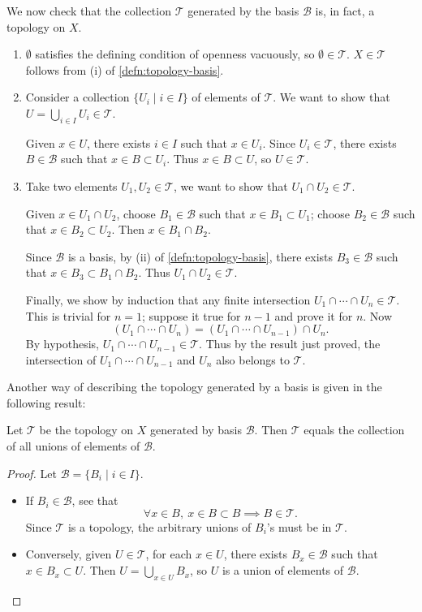 We now check that the collection $\mathcal{T}$ generated by the basis $\mathcal{B}$ is, in fact, a topology on $X$.
\begin{enumerate}[label=(\roman*)]
\item $\emptyset$ satisfies the defining condition of openness vacuously, so $\emptyset\in\mathcal{T}$. $X\in\mathcal{T}$ follows from (i) of \cref{defn:topology-basis}.
\item Consider a collection $\{U_i\mid i\in I\}$ of elements of $\mathcal{T}$. We want to show that $U=\bigcup_{i\in I}U_i\in\mathcal{T}$. 

Given $x\in U$, there exists $i\in I$ such that $x\in U_i$. Since $U_i\in\mathcal{T}$, there exists $B\in\mathcal{B}$ such that $x\in B\subset U_i$. Thus $x\in B\subset U$, so $U\in\mathcal{T}$.

\item Take two elements $U_1,U_2\in\mathcal{T}$, we want to show that $U_1\cap U_2\in\mathcal{T}$.

Given $x\in U_1\cap U_2$, choose $B_1\in\mathcal{B}$ such that $x\in B_1\subset U_1$; choose $B_2\in\mathcal{B}$ such that $x\in B_2\subset U_2$. Then $x\in B_1\cap B_2$.

Since $\mathcal{B}$ is a basis, by (ii) of \cref{defn:topology-basis}, there exists $B_3\in\mathcal{B}$ such that $x\in B_3\subset B_1\cap B_2$. Thus $U_1\cap U_2\in\mathcal{T}$.

Finally, we show by induction that any finite intersection $U_1\cap\cdots\cap U_n\in\mathcal{T}$. This is trivial for $n=1$; suppose it true for $n-1$ and prove it
for $n$. Now
\[(U_1\cap\cdots\cap U_n)=(U_1\cap\cdots\cap U_{n-1})\cap U_n.\]
By hypothesis, $U_1\cap\cdots\cap U_{n-1}\in\mathcal{T}$. Thus by the result just proved, the intersection of $U_1\cap\cdots\cap U_{n-1}$ and $U_n$ also belongs to $\mathcal{T}$.
\end{enumerate}

Another way of describing the topology generated by a basis is given in the following result:

\begin{lemma}\label{lemma:topology-generated-basis-unions}
Let $\mathcal{T}$ be the topology on $X$ generated by basis $\mathcal{B}$. Then $\mathcal{T}$ equals the collection of all unions of elements of $\mathcal{B}$.
\end{lemma}

\begin{proof}
Let $\mathcal{B}=\{B_i\mid i\in I\}$.
\begin{itemize}
\item If $B_i\in\mathcal{B}$, see that
\[\forall x\in B,\:x\in B\subset B\implies B\in\mathcal{T}.\]
Since $\mathcal{T}$ is a topology, the arbitrary unions of $B_i$'s must be in $\mathcal{T}$.
\item Conversely, given $U\in\mathcal{T}$, for each $x\in U$, there exists $B_x\in\mathcal{B}$ such that $x\in B_x\subset U$. Then $U=\bigcup_{x\in U}B_x$, so $U$ is a union of elements of $\mathcal{B}$.
\end{itemize}
\end{proof}

